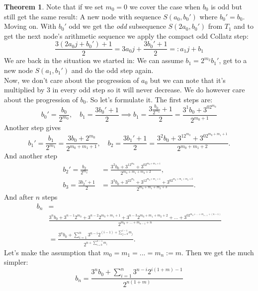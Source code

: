 \documentclass{article}
\theoremstyle{definition}
\newtheorem{theorem}{Theorem}[section]
\begin{document}
\begin{theorem}
Note that if we set $m_0=0$ we cover the case when $b_0$ is odd but still get the same result: A new node with sequence $S(a_0,b_0')$ where $b_0'=b_0$.
%
\\[.4cm]
%
Moving on. With $b_0'$ odd we get the \textit{odd} subsequence $S(2a_0,b_0')$ from $T_1$ and to get the next node's arithmetic sequence we apply the compact odd Collatz step:
\begin{equation*}
    \frac{3(2a_0j+b_0')+1}{2} = 3a_0j + \frac{3b_0'+1}{2} =: a_1j + b_1
\end{equation*}
We are back in the situation we started in: We can assume $b_1=2^{m_2}b_1'$, get to a new node $S(a_1, b_1')$ and do the odd step again.
%
\\[.4cm]
%
Now, we don't care about the progression of $a_0$ but we can note that it's multiplied by 3 in every odd step so it will never decrease. We do however care about the progression of $b_0$. So let's formulate it. The first steps are:
\begin{equation*}
    b_0' = \frac{b_0}{2^{m_0}}, \quad b_1 = \frac{3b_0' + 1}{2} \implies b_1 = \frac{3\frac{b_0}{2^{m_0}} + 1}{2} = \frac{3^1b_0 + 3^02^{m_0}}{2^{m_0+1}}
\end{equation*}
Another step gives
\begin{equation*}
    b_1' = \frac{b_1}{2^{m_1}} = \frac{3b_0 + 2^{m_0}}{2^{m_0+m_1+1}}, \quad b_2 = \frac{3b_1' + 1}{2} = \frac{3^2b_0 + 3^12^{m_0} + 3^02^{m_0+m_1+1}}{2^{m_0+m_1+2}}.
\end{equation*}
And another step
\begin{equation*}
\begin{split}
    b_2' = \frac{b_2}{2^{m_2}} & = \frac{3^2b_0 + 3^12^{m_0} + 3^02^{m_0+m_1+1}}{2^{m_0+m_1+m_2+2}}, \\
    b_3 = \frac{3b_2'+1}{2} & = \frac{3^3b_0 + 3^22^{m_0} + 3^12^{m_0+m_1+1} + 3^02^{m_0+m_1+m_2+2}}{2^{m_0+m_1+m_2+3}}.
\end{split}
\end{equation*}
And after $n$ steps
\begin{equation*}
\begin{split}
    b_n & = \\
    & \frac{3^nb_0 + 3^{n-1}2^{m_0} + 3^{n-2}2^{m_0+m_1+1} + 3^{n-3}2^{m_0+m_1+m_2+2}+...+3^02^{m_0+...+m_{n-1}+(n-1)}}{2^{m_0+...+m_{n-1}+n}} \\
    & = \frac{3^nb_0+\sum_{i=1}^n3^{n-i}2^{(i-1)+\sum_{j=0}^{i-1}m_j}}{2^{n+\sum_{i=0}^{n-1}m_i}}.
\end{split}
\end{equation*}
Let's make the assumption that $m_0=m_1=...=m_n:=m$. Then we get the much simpler:
\begin{equation*}
    b_n = \frac{3^nb_0+\sum_{i=1}^n3^{n-i}2^{i(1+m)-1}}{2^{n(1+m)}}
\end{equation*}
\end{theorem}
\end{document}
